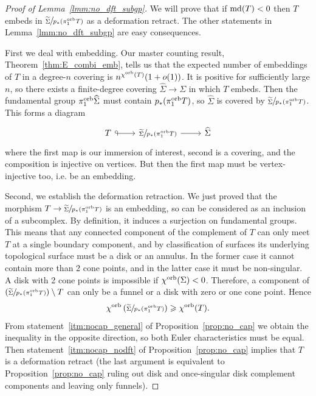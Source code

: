 \documentclass{amsart}
\newcommand{\cho}{\chi^{\textnormal{orb}}}
\newcommand{\md}{\textnormal{md}}
\newcommand{\pio}{\pi_1^{\textnormal{orb}}}
\newcommand{\whS}{{\widehat{\Sigma}}}
\begin{document}
\begin{proof}[Proof of Lemma~\ref{lmm:no_dft_subgp}]
We will prove that if $\md(T)<0$ then $T$ embeds in $\sfrac{\widetilde\Sigma}{p_*(\pio T)}$ as a deformation retract. The other statements in Lemma~\ref{lmm:no_dft_subgp} are easy consequences.

First we deal with embedding. Our master counting result, Theorem~\ref{thm:E_combi_emb}, tells us that the expected number of embeddings of $T$ in a degree-$n$ covering is $n^{\cho(T)}(1+o(1))$. It is positive for sufficiently large $n$, so there exists a finite-degree covering $\whS\to\Sigma$ in which $T$ embeds. Then the fundamental group $\pio\whS$ must contain $p_*(\pio T)$, so $\whS$ is covered by $\sfrac{\widetilde\Sigma}{p_*(\pio T)}$. This forms a diagram
\begin{equation*}\begin{tikzcd}
T\arrow[r,{Glyph[glyph math command=looparrowleft, swap]}->]&\sfrac{\widetilde\Sigma}{p_*(\pio T)}\arrow[r]&\whS
\end{tikzcd}\end{equation*}
where the first map is our immersion of interest, second is a covering, and the composition is injective on vertices. But then the first map must be vertex-injective too, i.e. be an embedding.

Second, we establish the deformation retraction. We just proved that the morphism $T\to\sfrac{\widetilde\Sigma}{p_*(\pio T)}$ is an embedding, so can be considered as an inclusion of a subcomplex. By definition, it induces a surjection on fundamental groups. This means that any connected component of the complement of $T$ can only meet $T$ at a single boundary component, and by classification of surfaces its underlying topological surface must be a disk or an annulus. In the former case it cannot contain more than 2 cone points, and in the latter case it must be non-singular. A disk with 2 cone points is impossible if $\cho(\Sigma)<0$. Therefore, a component of $\left(\sfrac{\widetilde\Sigma}{p_*(\pio T)}\right)\setminus T$ can only be a funnel or a disk with zero or one cone point. Hence
\begin{equation*}
\cho\left(\sfrac{\widetilde\Sigma}{p_*(\pio T)}\right)\geqslant\cho(T).
\end{equation*}
From statement~\ref*{itm:nocap_general} of Proposition~\ref{prop:no_cap} we obtain the inequality in the opposite direction, so both Euler characteristics must be equal. Then statement~\ref*{itm:nocap_nodft} of Proposition~\ref{prop:no_cap} implies that $T$ is a deformation retract (the last argument is equivalent to Proposition~\ref{prop:no_cap} ruling out disk and once-singular disk complement components and leaving only funnels).
\end{proof}
\end{document}
